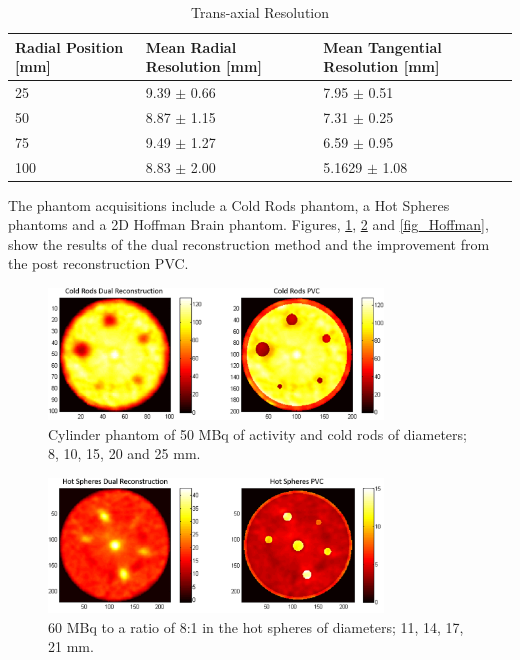 \begin{table}[!b]
\renewcommand{\arraystretch}{1.3}

\captionsetup{font=small}
\caption{Trans-axial Resolution}
\label{table_reso}
\centering

\begin{tabular}{|p{2.9cm}|p{4.6cm}|p{4.8cm}|}
\hline
Radial Position [mm]& Mean Radial Resolution [mm]& Mean Tangential Resolution [mm] \\
\hline
 25 & 9.39 $\pm$ 0.66 & 7.95 $\pm$ 0.51\\
\hline
 50 & 8.87 $\pm$ 1.15 & 7.31 $\pm$ 0.25\\
\hline
 75 & 9.49 $\pm$ 1.27 & 6.59 $\pm$ 0.95\\
\hline
 100 & 8.83 $\pm$ 2.00 & 5.1629 $\pm$ 1.08\\
\hline
\end{tabular}
\end{table}

 The phantom acquisitions include a Cold Rods phantom, a Hot Spheres phantoms and a 2D Hoffman Brain phantom. Figures, \ref{fig_cold}, \ref{fig_Hot} and \ref{fig_Hoffman}, show the results of the dual reconstruction method and the improvement from the post reconstruction PVC.

\begin{figure}[!t]
\centering
\includegraphics[width=3.5in]{figures/ColdRods.png}

\caption{Cylinder phantom of 50 MBq of activity and cold rods of diameters; 8, 10, 15, 20 and 25 mm.}
\label{fig_cold}
\end{figure}

\begin{figure}[!t]
\centering
\includegraphics[width=3.5in]{figures/HotSpheres.png}

\caption{60 MBq to a ratio of 8:1 in the hot spheres of diameters; 11, 14, 17, 21 mm.}
\label{fig_Hot}
\end{figure}

